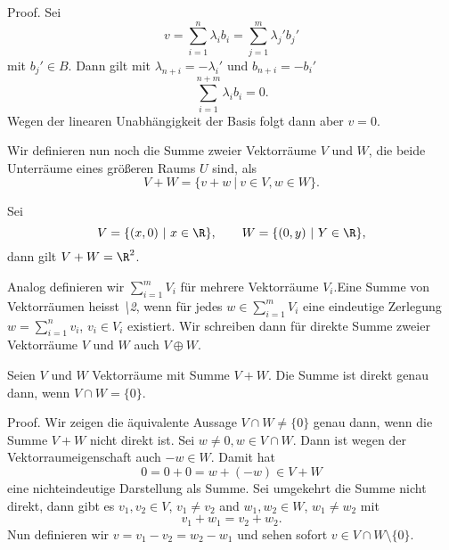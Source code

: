 \documentclass[letterpaper,10pt,english]{jupyterBook}
\begin{document}
\begin{emphBox}{}{}
Proof.  Sei
\begin{equation*}
 v = \sum_{i=1}^n \lambda_i b_i = \sum_{j=1}^m \lambda_j' b_j'
\end{equation*}
mit \(b_j' \in B\). Dann gilt mit \(\lambda_{n+i} = -\lambda_i'\) und \(b_{n+i}=-b_i'\)
\begin{equation*}
 \sum_{i=1}^{n+m} \lambda_i b_i = 0.
\end{equation*}
Wegen der linearen Unabhängigkeit der Basis folgt dann aber \(v=0\).
\end{emphBox}

Wir definieren nun noch die Summe zweier Vektorräume \(V\) und \(W\), die beide Unterräume eines größeren Raums \(U\) sind, als
\begin{equation*}
 V+W = \{ v + w ~|~ v \in V, w \in W \}.
\end{equation*}\label{vektorraeume/vektorraeume:example-12}
\begin{example}{}{}



Sei
\begin{equation*}
 V= \{(x,0)~|~x \in  \R \}, \qquad W= \{(0,y)~|~Y \in  \R \},
\end{equation*}
dann gilt  \(V+W = \R^2\).
\end{example}

Analog definieren wir \(\sum_{i=1}^m V_i\) für mehrere Vektorräume   \(V_i\).Eine Summe von Vektorräumen heisst \emph{\textbackslash{}2}, wenn für jedes \(w \in \sum_{i=1}^m V_i\) eine eindeutige Zerlegung\(w=\sum_{i=1}^n v_i\), \(v_i \in V_i\) existiert. Wir schreiben dann für direkte Summe zweier Vektorräume \(V\) und \(W\) auch \(V \oplus W\).
\label{vektorraeume/vektorraeume:lemma-13}
\begin{lemma}{}{}



Seien \(V\) und \(W\) Vektorräume mit Summe \(V+W\). Die Summe ist direkt genau dann, wenn \(V \cap W = \{0\}\).
\end{lemma}

\begin{emphBox}{}{}
Proof.  Wir zeigen die äquivalente Aussage \(V \cap W \neq \{0\}\) genau dann, wenn die Summe \(V+W\) nicht direkt ist. Sei \(w \neq 0, w \in V \cap W\). Dann ist wegen der Vektorraumeigenschaft auch \(-w \in W\). Damit hat
\begin{equation*}
 0  = 0 + 0 = w + (-w) \in V + W
\end{equation*}
eine nichteindeutige Darstellung als Summe. Sei umgekehrt die Summe nicht direkt, dann gibt es \(v_1,v_2 \in V\), \(v_1 \neq v_2\) and \(w_1, w_2 \in W\), \(w_1 \neq w_2\) mit
\begin{equation*}
 v_1 + w_1 = v_2 + w_2.
\end{equation*}
Nun definieren wir \(v = v_1-v_2 = w_2 -w_1\) und sehen sofort \(v \in V\cap W \setminus\{0\}\).
\end{emphBox}
\end{document}
